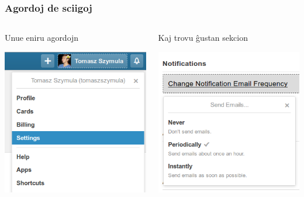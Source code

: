 \documentclass{beamer}
\begin{document}
  \begin{frame}
    \frametitle{Agordoj de sciigoj}
	\begin{columns}
	    \begin{block}{Unue eniru agordojn}
	    	\begin{center}
	     	\includegraphics[scale=0.35]{ekranoj/eniru-agordojn}
	    	\end{center}
    	\end{block}
    	\begin{block}{Kaj trovu ĝustan sekcion}
    		\begin{center}
    		\includegraphics[scale=0.35]{ekranoj/sciigoj-agordo}
    		\end{center}
    	\end{block}

	\end{columns}
  \end{frame}
\end{document}
